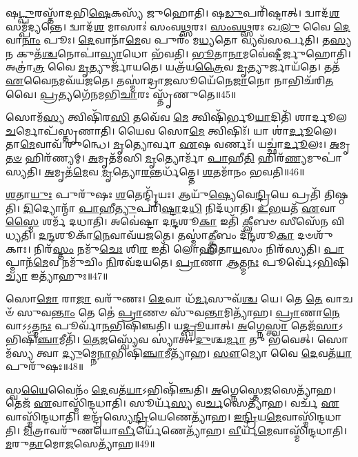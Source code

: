 𑌷\-\ul{𑌟𑍍𑌪𑍁}\-𑌰𑌸𑍍𑌤𑌾᳴𑌦𑌭𑌿\-\ul{𑌷𑍇}\-𑌕𑌸𑍍𑌯᳴ 𑌜𑍁𑌹𑍋𑌤𑌿।
𑌷\-\ul{𑌡𑍁}\-𑌪𑌰𑌿᳴𑌷𑍍𑌟𑌾𑌤𑍍।
𑌦𑍍𑌵𑌾𑌦᳴\-\ul{𑌶} 𑌸𑌮𑍍𑌪᳴𑌦𑍍𑌯𑌨𑍍𑌤𑍇।
𑌦𑍍𑌵𑌾𑌦᳴\-\ul{𑌶} 𑌮𑌾𑌸𑌾𑌃॑ 𑌸𑌂𑌵\-\ul{𑌥𑍍𑌸}\-𑌰𑌃।
\-\ul{𑌸𑌂}\-\-\ul{𑌵}\-\-\ul{𑌥𑍍𑌸}\-𑌰𑌃 𑌖\-\ul{𑌲𑍁} 𑌵𑍈 \ul{𑌦𑍇}\-𑌵𑌾\-\ul{𑌨𑌾𑌂} 𑌪𑍂𑌃।
\-\ul{𑌦𑍇}\-𑌵𑌾𑌨𑌾᳴\-\ul{𑌮𑍇}\-𑌵 𑌪𑍁𑌰𑌂᳴ 𑌮\-\ul{𑌧𑍍𑌯}\-𑌤𑍋 𑌵𑍍𑌯𑌵᳴𑌸𑌰𑍍𑌪𑌤𑌿।
𑌤\-\ul{𑌸𑍍𑌯} 𑌨 𑌕𑍁𑌤᳴\-\ul{𑌶𑍍𑌚}\-𑌨𑍋𑌪𑌾॑\-\ul{𑌵𑍍𑌯𑌾}\-𑌧𑍋 𑌭᳴𑌵𑌤𑌿।
\-\ul{𑌭𑍂}\-𑌤𑌾\-\ul{𑌨𑌾}\-𑌮𑌵𑍇॑𑌷𑍍𑌟𑍀𑌰𑍍𑌜𑍁𑌹𑍋𑌤𑌿।
𑌅𑌤𑍍𑌰𑌾॑\-\ul{𑌤𑍍𑌰} 𑌵𑍈 \ul{𑌮𑍃}\-𑌤𑍍𑌯𑍁𑌰𑍍𑌜𑌾᳴𑌯𑌤𑍇।
𑌯𑌤𑍍𑌰᳴𑌯\-\ul{𑌤𑍍𑌰𑍈}\-𑌵 \ul{𑌮𑍃}\-𑌤𑍍𑌯𑍁𑌰𑍍𑌜𑌾𑌯᳴𑌤𑍇।
𑌤𑌤᳴ \ul{𑌏}\-𑌵𑍈\-\ul{𑌨}\-𑌮𑌵᳴𑌯𑌜𑌤𑍇।
𑌤𑌸𑍍𑌮𑌾॑𑌦𑍍𑌰𑌾\-\ul{𑌜}\-𑌸𑍂𑌯𑍇᳴𑌨𑍇\-\ul{𑌜𑌾}\-𑌨𑍋 𑌨𑌾𑌭𑌿𑌚᳴𑌰𑌿\-\ul{𑌤}\-𑌵𑍈।
\-\ul{𑌪𑍍𑌰}\-𑌤𑍍𑌯𑌗𑍇᳴𑌨𑌮𑌭𑌿\-\ul{𑌚𑌾}\-𑌰𑌃 𑌸𑍍𑌤𑍃᳴𑌣𑍁𑌤𑍇॥45॥\anuvakamend[\-\ul{𑌰𑍁}\-\-\ul{𑌨𑍍𑌧𑍇} 𑌸𑌮᳴𑌷𑍍𑌟𑍍𑌯𑌾 𑌅𑌸𑌿𑌚𑍍𑌯𑌤 𑌸𑍍𑌥𑌾𑌪𑌯\-\ul{𑌤𑌿} 𑌜𑌾𑌯᳴\-\ul{𑌤𑍇} 𑌪𑌞𑍍𑌚᳴ 𑌚]

𑌸𑍋𑌮᳴\-\ul{𑌸𑍍𑌯} 𑌤𑍍𑌵𑌿𑌷𑌿᳴𑌰\-\ul{𑌸𑌿} 𑌤𑌵𑍇᳴𑌵 \ul{𑌮𑍇} 𑌤𑍍𑌵𑌿𑌷𑌿᳴𑌰𑍍𑌭𑍂\-\ul{𑌯𑌾}\-𑌦𑌿𑌤𑌿᳴ 𑌶𑌾𑌰𑍍𑌦𑍂𑌲\-\-\ul{𑌚}\-𑌰𑍍𑌮𑍋𑌪᳴𑌸𑍍𑌤𑍃𑌣𑌾𑌤𑌿।
𑌯𑍈𑌵 𑌸𑍋\-\ul{𑌮𑍇} 𑌤𑍍𑌵𑌿𑌷𑌿𑌃᳴।
𑌯𑌾 𑌶𑌾॑\-\ul{𑌰𑍍𑌦𑍂}\-𑌲𑍇।
𑌤𑌾\-\ul{𑌮𑍇}\-𑌵𑌾𑌵᳴ 𑌰𑍁𑌨𑍍𑌧𑍇।
\-\ul{𑌮𑍃}\-𑌤𑍍𑌯𑍋𑌰𑍍𑌵𑌾 \ul{𑌏}\-𑌷 𑌵𑌰𑍍𑌣𑌃᳴।
𑌯𑌚𑍍𑌛𑌾॑\-\ul{𑌰𑍍𑌦𑍂}\-𑌲𑌃।
\-\ul{𑌅}\-𑌮𑍃\-\ul{𑌤}\-\-\ul{𑍞} 𑌹𑌿𑌰᳴𑌣𑍍𑌯𑌮𑍍।
\-\ul{𑌅}\-𑌮𑍃𑌤᳴𑌮𑌸𑌿 \ul{𑌮𑍃}\-𑌤𑍍𑌯𑍋𑌰𑍍𑌮𑌾᳴ \ul{𑌪𑌾}\-𑌹𑍀\-\ul{𑌤𑌿} 𑌹𑌿𑌰᳴\-\ul{𑌣𑍍𑌯}\-𑌮𑍁𑌪𑌾॑𑌸𑍍𑌯𑌤𑌿।
\-\ul{𑌅}\-𑌮𑍃𑌤᳴\-\ul{𑌮𑍇}\-𑌵 \ul{𑌮𑍃}\-𑌤𑍍𑌯𑍋\-\ul{𑌰}\-𑌨𑍍𑌤𑌰𑍍𑌧᳴𑌤𑍍𑌤𑍇।
\-\ul{𑌶}\-𑌤𑌮𑌾᳴𑌨𑌂 𑌭𑌵𑌤𑌿॥46॥

\-\ul{𑌶}\-𑌤𑌾\-\ul{𑌯𑍁𑌃} 𑌪𑍁𑌰𑍁᳴𑌷𑌃 \ul{𑌶}\-𑌤𑍇𑌨𑍍𑌦𑍍𑌰𑌿᳴𑌯𑌃।
𑌆𑌯𑍁᳴\-\ul{𑌷𑍍𑌯𑍇}\-𑌵𑍇\-\ul{𑌨𑍍𑌦𑍍𑌰𑌿}\-𑌯𑍇 𑌪𑍍𑌰𑌤𑌿᳴ 𑌤𑌿𑌷𑍍𑌠𑌤𑌿।
\-\ul{𑌦𑌿}\-𑌦𑍍𑌯𑍋𑌨𑍍𑌮𑌾᳴ \ul{𑌪𑌾}\-𑌹𑍀\-\ul{𑌤𑍍𑌯𑍁}\-𑌪𑌰𑌿᳴\-\ul{𑌷𑍍𑌟𑌾}\-𑌦\-\ul{𑌧𑌿} 𑌨𑌿𑌦᳴𑌧𑌾𑌤𑌿।
\-\ul{𑌉}\-\-\ul{𑌭}\-𑌯𑌤᳴ \ul{𑌏}\-𑌵𑌾\-\ul{𑌸𑍍𑌮𑍈} 𑌶𑌰𑍍𑌮᳴ 𑌦𑌧𑌾𑌤𑌿।
𑌅𑌵𑍇॑𑌷𑍍𑌟𑌾 𑌦\-\ul{𑌨𑍍𑌦}\-𑌶𑍂\-\ul{𑌕𑌾} 𑌇𑌤𑌿᳴ \ul{𑌕𑍍𑌲𑍀}\-𑌬𑍞 𑌸𑍀𑌸𑍇᳴𑌨 𑌵𑌿𑌧𑍍𑌯𑌤𑌿।
\-\ul{𑌦}\-\-\ul{𑌨𑍍𑌦}\-𑌶𑍂𑌕𑌾᳴\-\ul{𑌨𑍇}\-𑌵𑌾𑌵᳴𑌯𑌜𑌤𑍇।
𑌤𑌸𑍍𑌮𑌾॑\-\ul{𑌤𑍍𑌕𑍍𑌲𑍀}\-𑌬𑌂 𑌦᳴\-\ul{𑌨𑍍𑌦}\-𑌶𑍂\-\ul{𑌕𑌾} 𑌦𑍞𑌶𑍁᳴𑌕𑌾𑌃।
𑌨𑌿𑌰᳴\-\ul{𑌸𑍍𑌤𑌂} 𑌨𑌮𑍁᳴\-\ul{𑌚𑍇𑌃} 𑌶𑌿\-\ul{𑌰} 𑌇𑌤𑌿᳴ 𑌲𑍋𑌹𑌿𑌤𑌾\-\ul{𑌯}\-𑌸𑌂 𑌨𑌿𑌰᳴𑌸𑍍𑌯𑌤𑌿।
\-\ul{𑌪𑌾}\-𑌪𑍍𑌮𑌾𑌨᳴\-\ul{𑌮𑍇}\-𑌵 𑌨𑌮𑍁᳴𑌚𑌿𑌂 \ul{𑌨𑌿}\-𑌰𑌵᳴𑌦𑌯𑌤𑍇।
\-\ul{𑌪𑍍𑌰𑌾}\-𑌣𑌾 \ul{𑌆}\-𑌤𑍍𑌮\-\ul{𑌨𑌃} 𑌪𑍂𑌰𑍍𑌵𑍇᳴\-𑌽\-\ul{𑌭𑌿}\-𑌷𑌿\-\ul{𑌚𑍍𑌯𑌾} 𑌇𑌤𑍍𑌯𑌾᳴𑌹𑍁𑌃॥47॥

𑌸𑍋\-\ul{𑌮𑍋} 𑌰𑌾\-\ul{𑌜𑌾} 𑌵𑌰𑍁᳴𑌣𑌃।
\-\ul{𑌦𑍇}\-𑌵𑌾 𑌧᳴\-\ul{𑌰𑍍𑌮}\-𑌸𑍁𑌵᳴\-\ul{𑌶𑍍𑌚} 𑌯𑍇।
𑌤𑍇 \ul{𑌤𑍇} 𑌵𑌾𑌚𑍞᳴ 𑌸𑍁𑌵\-\ul{𑌨𑍍𑌤𑌾𑌂} 𑌤𑍇 𑌤𑍇॑ \ul{𑌪𑍍𑌰𑌾}\-𑌣𑍞 𑌸𑍁᳴𑌵\-\ul{𑌨𑍍𑌤𑌾}\-𑌮𑌿𑌤𑍍𑌯𑌾᳴𑌹।
\-\ul{𑌪𑍍𑌰𑌾}\-𑌣𑌾\-\ul{𑌨𑍇}\-𑌵𑌾\-𑌽𑌽𑌤𑍍𑌮\-\ul{𑌨𑌃} 𑌪𑍂𑌰𑍍𑌵𑌾᳴\-\ul{𑌨}\-𑌭𑌿𑌷𑌿᳴𑌞𑍍𑌚𑌤𑌿।
𑌯\-\ul{𑌦𑍍𑌬𑍍𑌰𑍂}\-𑌯𑌾𑌤𑍍।
\-\ul{𑌅}\-𑌗𑍍𑌨𑍇\-\ul{𑌸𑍍𑌤𑍍𑌵𑌾} 𑌤𑍇𑌜᳴\-\ul{𑌸𑌾}\-\-𑌽𑌭𑌿𑌷𑌿᳴\-\ul{𑌞𑍍𑌚𑌾}\-𑌮𑍀𑌤𑌿᳴।
\-\ul{𑌤𑍇}\-\-\ul{𑌜}\-𑌸𑍍𑌵𑍍𑌯𑍇᳴𑌵 𑌸𑍍𑌯𑌾॑𑌤𑍍।
\-\ul{𑌦𑍁}\-𑌶𑍍𑌚\-\ul{𑌰𑍍𑌮𑌾} 𑌤𑍁 𑌭᳴𑌵𑍇𑌤𑍍।
𑌸𑍋𑌮᳴𑌸𑍍𑌯 𑌤𑍍𑌵𑌾 \ul{𑌦𑍍𑌯𑍁}\-𑌮𑍍𑌨𑍇\-\ul{𑌨𑌾}\-𑌭𑌿𑌷𑌿᳴\-\ul{𑌞𑍍𑌚𑌾}\-𑌮𑍀𑌤𑍍𑌯𑌾᳴𑌹।
\-\ul{𑌸𑍗}\-𑌮𑍍𑌯𑍋 𑌵𑍈 \ul{𑌦𑍇}\-𑌵𑌤᳴\-\ul{𑌯𑌾} 𑌪𑍁𑌰𑍁᳴𑌷𑌃॥48॥

𑌸𑍍𑌵\-\ul{𑌯𑍈}\-𑌵𑍈𑌨𑌂᳴ \ul{𑌦𑍇}\-𑌵𑌤᳴\-\ul{𑌯𑌾}\-\-𑌽𑌭𑌿𑌷𑌿᳴𑌞𑍍𑌚𑌤𑌿।
\-\ul{𑌅}\-𑌗𑍍𑌨𑍇𑌸𑍍𑌤𑍇\-\ul{𑌜}\-𑌸𑍇𑌤𑍍𑌯𑌾᳴𑌹।
𑌤𑍇𑌜᳴ \ul{𑌏}\-𑌵𑌾𑌸𑍍𑌮𑌿᳴𑌨𑍍𑌦𑌧𑌾𑌤𑌿।
𑌸𑍂𑌰𑍍𑌯᳴\-\ul{𑌸𑍍𑌯} 𑌵\-\ul{𑌰𑍍𑌚}\-𑌸𑍇𑌤𑍍𑌯𑌾᳴𑌹।
𑌵𑌰𑍍𑌚᳴ \ul{𑌏}\-𑌵𑌾𑌸𑍍𑌮𑌿᳴𑌨𑍍𑌦𑌧𑌾𑌤𑌿।
𑌇𑌨𑍍𑌦𑍍𑌰᳴𑌸𑍍𑌯𑍇\-\ul{𑌨𑍍𑌦𑍍𑌰𑌿}\-𑌯𑍇𑌣𑍇𑌤𑍍𑌯𑌾᳴𑌹।
\-\ul{𑌇}\-\-\ul{𑌨𑍍𑌦𑍍𑌰𑌿}\-𑌯\-\ul{𑌮𑍇}\-𑌵𑌾𑌸𑍍𑌮𑌿᳴𑌨𑍍𑌦𑌧𑌾𑌤𑌿।
\-\ul{𑌮𑌿}\-𑌤𑍍𑌰𑌾𑌵𑌰𑍁᳴𑌣\-𑌯𑍋\-\ul{𑌰𑍍𑌵𑍀}\-𑌰𑍍𑌯𑍇᳴𑌣𑍇𑌤𑍍𑌯𑌾᳴𑌹।
\-\ul{𑌵𑍀}\-𑌰𑍍𑌯᳴\-\ul{𑌮𑍇}\-𑌵𑌾𑌸𑍍𑌮𑌿᳴𑌨𑍍𑌦𑌧𑌾𑌤𑌿।
\-\ul{𑌮}\-𑌰𑍁\-\ul{𑌤𑌾}\-𑌮𑍋\-\ul{𑌜}\-𑌸𑍇𑌤𑍍𑌯𑌾᳴𑌹॥49॥

